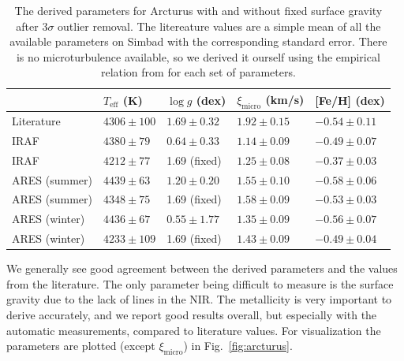 \documentclass{aa}
\begin{document}
\begin{table}[htb!]
    \caption{The derived parameters for Arcturus with and without fixed surface
             gravity after 3$\sigma$ outlier removal. The litereature values are
             a simple mean of all the available parameters on Simbad with the
             corresponding standard error. There is no microturbulence
             available, so we derived it ourself using the empirical relation
             from \citet{Adibekyan2015} for each set of parameters.}
    \label{tab:arcturus}
    \centering
    \begin{tabular}{lllll}
      \hline\hline
                      & $T_\mathrm{eff}$ (K) &  $\log g$ (dex)  &   $\xi_\mathrm{micro}$ (km/s)   & [Fe/H] (dex)     \\
      \hline
        Literature    & $4306 \pm 100$       &  $1.69 \pm 0.32$ &    $1.92 \pm 0.15$              & $-0.54 \pm 0.11$ \\
      \hline
        IRAF          & $4380 \pm  79$       &  $0.64 \pm 0.33$ &    $1.14 \pm 0.09$              & $-0.49 \pm 0.07$ \\
        IRAF          & $4212 \pm  77$       &   1.69 (fixed)   &    $1.25 \pm 0.08$              & $-0.37 \pm 0.03$ \\
      \hline
        ARES (summer) & $4439 \pm  63$       &  $1.20 \pm 0.20$ &    $1.55 \pm 0.10$              & $-0.58 \pm 0.06$ \\
        ARES (summer) & $4348 \pm  75$       &   1.69 (fixed)   &    $1.58 \pm 0.09$              & $-0.53 \pm 0.03$ \\
        ARES (winter) & $4436 \pm  67$       &  $0.55 \pm 1.77$ &    $1.35 \pm 0.09$              & $-0.56 \pm 0.07$ \\
        ARES (winter) & $4233 \pm 109$       &   1.69 (fixed)   &    $1.43 \pm 0.09$              & $-0.49 \pm 0.04$ \\
      \hline
    \end{tabular}
\end{table}

We generally see good agreement between the derived parameters and the values
from the literature. The only parameter being difficult to measure is the
surface gravity due to the lack of  lines in the NIR. The
metallicity is very important to derive accurately, and we report good results
overall, but especially with the automatic measurements, compared to literature
values. For visualization the parameters are plotted (except
$\xi_\mathrm{micro}$) in Fig.~\ref{fig:arcturus}.
\end{document}
